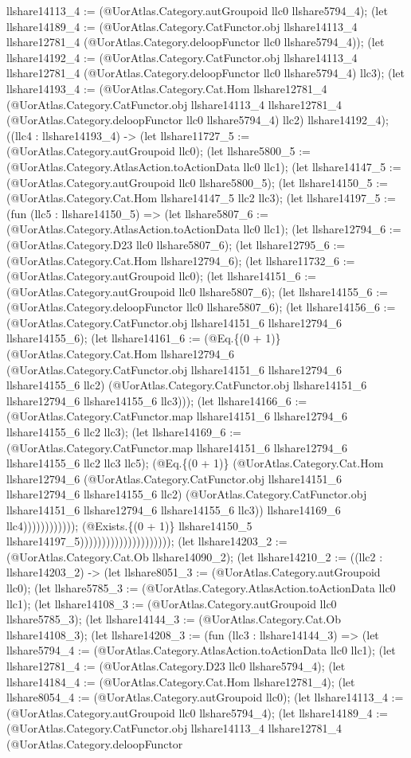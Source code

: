 \documentclass[11pt]{article}
\begin{document}
llshare14113\_4 := (@UorAtlas.Category.autGroupoid llc0 llshare5794\_4); (let llshare14189\_4 := (@UorAtlas.Category.CatFunctor.obj llshare14113\_4 llshare12781\_4 (@UorAtlas.Category.deloopFunctor llc0 llshare5794\_4)); (let llshare14192\_4 := (@UorAtlas.Category.CatFunctor.obj llshare14113\_4 llshare12781\_4 (@UorAtlas.Category.deloopFunctor llc0 llshare5794\_4) llc3); (let llshare14193\_4 := (@UorAtlas.Category.Cat.Hom llshare12781\_4 (@UorAtlas.Category.CatFunctor.obj llshare14113\_4 llshare12781\_4 (@UorAtlas.Category.deloopFunctor llc0 llshare5794\_4) llc2) llshare14192\_4); ((llc4 : llshare14193\_4) -> (let llshare11727\_5 := (@UorAtlas.Category.autGroupoid llc0); (let llshare5800\_5 := (@UorAtlas.Category.AtlasAction.toActionData llc0 llc1); (let llshare14147\_5 := (@UorAtlas.Category.autGroupoid llc0 llshare5800\_5); (let llshare14150\_5 := (@UorAtlas.Category.Cat.Hom llshare14147\_5 llc2 llc3); (let llshare14197\_5 := (fun (llc5 : llshare14150\_5) => (let llshare5807\_6 := (@UorAtlas.Category.AtlasAction.toActionData llc0 llc1); (let llshare12794\_6 := (@UorAtlas.Category.D23 llc0 llshare5807\_6); (let llshare12795\_6 := (@UorAtlas.Category.Cat.Hom llshare12794\_6); (let llshare11732\_6 := (@UorAtlas.Category.autGroupoid llc0); (let llshare14151\_6 := (@UorAtlas.Category.autGroupoid llc0 llshare5807\_6); (let llshare14155\_6 := (@UorAtlas.Category.deloopFunctor llc0 llshare5807\_6); (let llshare14156\_6 := (@UorAtlas.Category.CatFunctor.obj llshare14151\_6 llshare12794\_6 llshare14155\_6); (let llshare14161\_6 := (@Eq.\{(0 + 1)\} (@UorAtlas.Category.Cat.Hom llshare12794\_6 (@UorAtlas.Category.CatFunctor.obj llshare14151\_6 llshare12794\_6 llshare14155\_6 llc2) (@UorAtlas.Category.CatFunctor.obj llshare14151\_6 llshare12794\_6 llshare14155\_6 llc3))); (let llshare14166\_6 := (@UorAtlas.Category.CatFunctor.map llshare14151\_6 llshare12794\_6 llshare14155\_6 llc2 llc3); (let llshare14169\_6 := (@UorAtlas.Category.CatFunctor.map llshare14151\_6 llshare12794\_6 llshare14155\_6 llc2 llc3 llc5); (@Eq.\{(0 + 1)\} (@UorAtlas.Category.Cat.Hom llshare12794\_6 (@UorAtlas.Category.CatFunctor.obj llshare14151\_6 llshare12794\_6 llshare14155\_6 llc2) (@UorAtlas.Category.CatFunctor.obj llshare14151\_6 llshare12794\_6 llshare14155\_6 llc3)) llshare14169\_6 llc4)))))))))))); (@Exists.\{(0 + 1)\} llshare14150\_5 llshare14197\_5))))))))))))))))))))); (let llshare14203\_2 := (@UorAtlas.Category.Cat.Ob llshare14090\_2); (let llshare14210\_2 := ((llc2 : llshare14203\_2) -> (let llshare8051\_3 := (@UorAtlas.Category.autGroupoid llc0); (let llshare5785\_3 := (@UorAtlas.Category.AtlasAction.toActionData llc0 llc1); (let llshare14108\_3 := (@UorAtlas.Category.autGroupoid llc0 llshare5785\_3); (let llshare14144\_3 := (@UorAtlas.Category.Cat.Ob llshare14108\_3); (let llshare14208\_3 := (fun (llc3 : llshare14144\_3) => (let llshare5794\_4 := (@UorAtlas.Category.AtlasAction.toActionData llc0 llc1); (let llshare12781\_4 := (@UorAtlas.Category.D23 llc0 llshare5794\_4); (let llshare14184\_4 := (@UorAtlas.Category.Cat.Hom llshare12781\_4); (let llshare8054\_4 := (@UorAtlas.Category.autGroupoid llc0); (let llshare14113\_4 := (@UorAtlas.Category.autGroupoid llc0 llshare5794\_4); (let llshare14189\_4 := (@UorAtlas.Category.CatFunctor.obj llshare14113\_4 llshare12781\_4 (@UorAtlas.Category.deloopFunctor 
\end{document}
